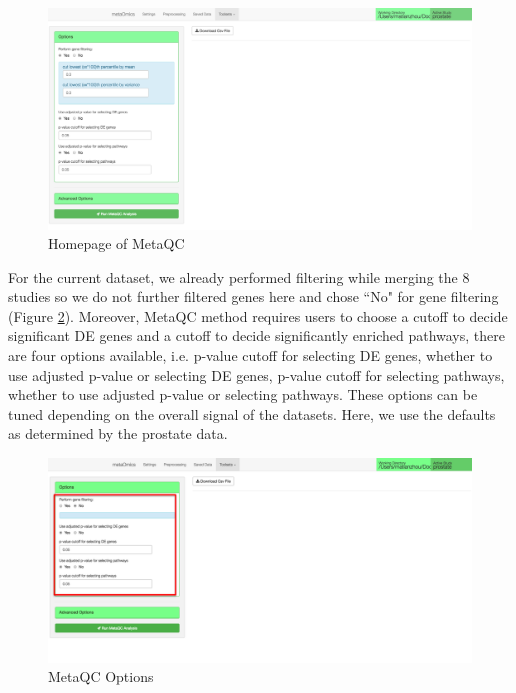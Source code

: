 \begin{figure}[H]
\begin{center}
\includegraphics[scale=0.5]{./figure/metaQC/MetaQCmainpage}
\caption{Homepage of MetaQC}
\label{fig:MetaQCmainpage}
\end{center}
\end{figure}

For the current dataset, we already performed filtering while merging the 8 studies so we do not further filtered genes here and chose  ``No" for gene filtering (Figure \ref{fig:option1}). Moreover, MetaQC method requires users to choose a cutoff to decide significant DE genes and a cutoff to decide significantly enriched pathways, there are four options available, i.e. p-value cutoff for selecting DE genes, whether to use adjusted p-value or selecting DE genes, p-value cutoff for selecting pathways, whether to use adjusted p-value or selecting pathways. These options can be tuned depending on the overall signal of the datasets. Here, we use the defaults as determined by the prostate data.   

\begin{figure}[H]
\begin{center}
\includegraphics[scale=0.5]{./figure/metaQC/option1}
\caption{MetaQC Options}
\label{fig:option1}
\end{center}
\end{figure}

